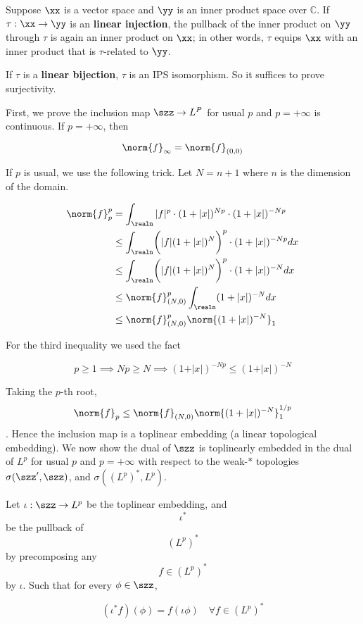 Suppose \(\xx\) is a vector space and \(\yy\) is an inner product space
over \(\mathbb{C}\). If \(\tau:\xx\to\yy\) is an \textbf{linear
injection}, the pullback of the inner product on \(\yy\) through
\(\tau\) is again an inner product on \(\xx\); in other words, \(\tau\)
equips \(\xx\) with an inner product that is \(\tau\)-related to
\(\yy\).

If \(\tau\) is a \textbf{linear bijection}, \(\tau\) is an IPS
isomorphism. So it suffices to prove surjectivity.

First, we prove the inclusion map \(\szz\to L^P\) for usual \(p\) and
\(p = +\infty\) is continuous. If \(p = +\infty\), then

\[
\norm{f}_{\infty}=\norm{f}_{(0,0)}
\]

If \(p\) is usual, we use the following trick. Let \(N = n+1\) where
\(n\) is the dimension of the domain.

\[
\begin{align}
\norm{f}_{p}^{p} &= \int_{\realn}\vert f\vert^{p} \cdot(1+\vert x\vert)^{Np}\cdot(1+\vert x\vert)^{-Np}\\
&\leq \int_{\realn} \biggl(\vert f\vert (1+\vert x\vert )^N\biggr)^p\cdot (1+\vert x\vert )^{-Np}dx\\
&\leq \int_{\realn} \biggl(\vert f\vert (1+\vert x\vert )^N\biggr)^p\cdot (1+\vert x\vert )^{-N}dx\\
&\leq \norm{f}_{(N,0)}^{p}\int_{\realn}(1+\vert x\vert)^{-N}dx\\
&\leq \norm{f}_{(N,0)}^{p}\norm{(1+\vert x\vert)^{-N}}_{1}
\end{align}
\]

For the third inequality we used the fact

\[
p\geq 1\implies Np\geq N\implies (1+\vert x\vert)^{-Np}\leq (1+\vert x \vert)^{-N}
\]

Taking the \(p\)-th root,
\[\norm{f}_{p}\leq\norm{f}_{(N,0)}\norm{(1+\vert x\vert)^{-N}}_{1}^{1/p} \].
Hence the inclusion map is a toplinear embedding (a linear topological
embedding). We now show the dual of \(\szz\) is toplinearly embedded in
the dual of \(L^{p}\) for usual \(p\) and \(p = +\infty\) with respect
to the weak-\(\ast\) topologies \(\sigma(\szz', \szz)\), and
\(\sigma((L^p)^*, L^p)\).

Let \(\iota: \szz\to L^p\) be the toplinear embedding, and \[\iota^*\]
be the pullback of \[(L^p)^*\] by precomposing any \[f\in (L^p)^*\] by
\(\iota\). Such that for every \(\phi\in\szz\),

\[
(\iota^*f)(\phi) = f(\iota\phi)\quad\forall f\in (L^p)^*
\]

